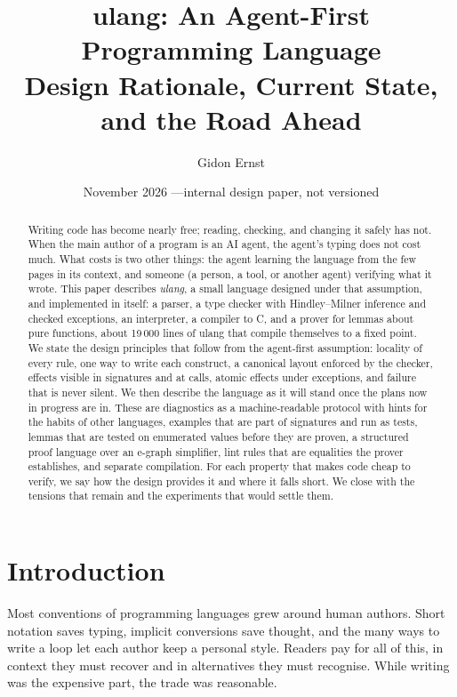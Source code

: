 \documentclass[11pt,a4paper]{article}
\title{\textbf{ulang: An Agent-First Programming Language}\\[0.4em]
\large Design Rationale, Current State, and the Road Ahead}
\author{Gidon Ernst}
\date{November 2026 \quad---\quad internal design paper, not versioned}
\begin{document}
\maketitle

\begin{abstract}
\noindent
Writing code has become nearly free; reading, checking, and changing it safely has not.
When the main author of a program is an AI agent, the agent's typing does not cost much.
What costs is two other things: the agent learning the language from the few pages in its
context, and someone (a person, a tool, or another agent) verifying what it wrote.
This paper describes \emph{ulang}, a small language designed under that assumption, and
implemented in itself: a parser, a type checker with Hindley--Milner inference and checked
exceptions, an interpreter, a compiler to C, and a prover for lemmas about pure functions,
about 19\,000 lines of ulang that compile themselves to a fixed point. We state the design
principles that follow from the agent-first assumption: locality of every rule, one way to
write each construct, a canonical layout enforced by the checker, effects visible in
signatures and at calls, atomic effects under exceptions, and failure that is never silent.
We then describe the language as it will stand once the plans now in progress are in. These
are diagnostics as a machine-readable protocol with hints for the habits of other
languages, examples that are part of signatures and run as tests, lemmas that are tested
on enumerated values before they are proven, a structured proof language over an e-graph
simplifier, lint rules that are equalities the prover establishes, and separate compilation.
For each property that makes code cheap to verify, we say how the design provides it and
where it falls short. We close with the tensions that remain and the experiments that would
settle them.
\end{abstract}

\tableofcontents
\bigskip

\section{Introduction}

Most conventions of programming languages grew around human authors. Short notation saves
typing, implicit conversions save thought, and the many ways to write a loop let each author
keep a personal style. Readers pay for all of this, in context they must recover and in
alternatives they must recognise. While writing was the expensive part, the trade was
reasonable.
\end{document}
